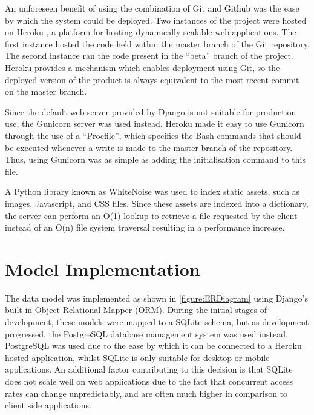 \documentclass[a4paper]{l3proj}
\begin{document}
An unforeseen benefit of using the combination of Git and Github was the ease by which the system could be deployed. Two instances of the project \cite{site:liveproject} were hosted on Heroku \cite{site:heroku}, a platform for hosting dynamically scalable web applications. The first instance hosted the code held within the master branch of the Git repository. The second instance ran the code present in the “beta” branch of the project. Heroku provides a mechanism which enables deployment using Git, so the deployed version of the product is always equivalent to the most recent commit on the master branch.

Since the default web server provided by Django is not suitable for production use, the Gunicorn \cite{site:gunicorn} server was used instead. Heroku made it easy to use Gunicorn through the use of a “Procfile”, which specifies the Bash commands that should be executed whenever a write is made to the master branch of the repository. Thus, using Gunicorn was as simple as adding the initialisation command to this file.

A Python library known as WhiteNoise \cite{site:whitenoise} was used to index static assets, such as images, Javascript, and CSS files. Since these assets are indexed into a dictionary, the server can perform an O(1) lookup to retrieve a file requested by the client instead of an O(n) file system traversal resulting in a performance increase.

\section{Model Implementation}
\label{modelImpl}


The data model was implemented as shown in \autoref{figure:ERDiagram} using Django’s built in Object Relational Mapper (ORM). During the initial stages of development, these models were mapped to a SQLite \cite{site:sqlite} schema, but as development progressed, the PostgreSQL database management system was used instead. PostgreSQL \cite{site:postgresql} was used due to the ease by which it can be connected to a Heroku hosted application, whilst SQLite is only suitable for desktop or mobile applications. An additional factor contributing to this decision is that SQLite does not scale well on web applications due to the fact that concurrent access rates can change unpredictably, and are often much higher in comparison to client side applications.
\end{document}
